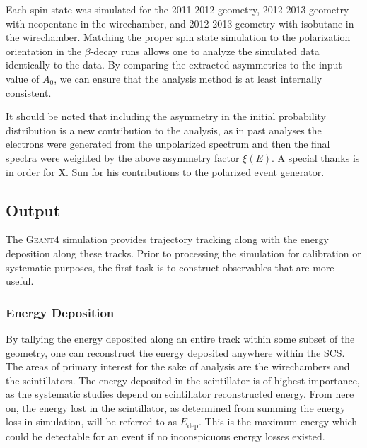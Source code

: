 Each spin state was simulated for the 2011-2012 geometry, 2012-2013 geometry with neopentane in the wirechamber,
and 2012-2013 geometry with isobutane in the wirechamber. Matching the proper spin state simulation to the polarization orientation
in the $\beta$-decay runs allows one to analyze the simulated data identically to the data. By comparing the
extracted asymmetries to the input value of $A_0$, we can ensure that the analysis method is at least internally
consistent.

It should be noted that including the asymmetry in the initial probability distribution
is a new contribution to the analysis, as in past analyses the electrons were generated from the unpolarized
spectrum and then the final spectra were weighted by the above asymmetry factor $\xi(E)$.
A special thanks is in order for X. Sun for his contributions to the polarized event generator.

\subsection{Output}
The \textsc{Geant4} simulation provides trajectory tracking along with
the energy deposition along these tracks. Prior to processing the simulation
for calibration or systematic purposes, the first
task is to construct observables that are more useful.

\subsubsection{Energy Deposition}
By tallying the energy deposited along an entire track within some subset
of the geometry, one can reconstruct the energy deposited anywhere within
the SCS. The areas of primary interest for the sake of analysis are the
wirechambers and the scintillators. The energy deposited in the scintillator
is of highest importance, as the systematic studies depend on scintillator
reconstructed energy.  From here on,
the energy lost in the scintillator, as determined from summing the energy loss in simulation, will be
referred to as $E_{\mathrm{dep}}$. This is the maximum energy which could be detectable
for an event if no inconspicuous energy losses existed.

